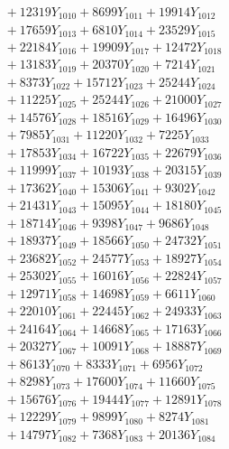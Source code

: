 \documentclass[a4paper,10pt]{article}
\begin{document}
{\begin{align}
&\;  + 12319 Y_{1010} + 8699 Y_{1011} + 19914 Y_{1012} \\[0.3ex]
&\;  + 17659 Y_{1013} + 6810 Y_{1014} + 23529 Y_{1015} \\[0.3ex]
&\;  + 22184 Y_{1016} + 19909 Y_{1017} + 12472 Y_{1018} \\[0.5ex]\allowbreak
&\;  + 13183 Y_{1019} + 20370 Y_{1020} + 7214 Y_{1021} \\[0.3ex]
&\;  + 8373 Y_{1022} + 15712 Y_{1023} + 25244 Y_{1024} \\[0.3ex]
&\;  + 11225 Y_{1025} + 25244 Y_{1026} + 21000 Y_{1027} \\[0.3ex]
&\;  + 14576 Y_{1028} + 18516 Y_{1029} + 16496 Y_{1030} \\[0.3ex]
&\;  + 7985 Y_{1031} + 11220 Y_{1032} + 7225 Y_{1033} \\[0.3ex]
&\;  + 17853 Y_{1034} + 16722 Y_{1035} + 22679 Y_{1036} \\[0.3ex]
&\;  + 11999 Y_{1037} + 10193 Y_{1038} + 20315 Y_{1039} \\[0.3ex]
&\;  + 17362 Y_{1040} + 15306 Y_{1041} + 9302 Y_{1042} \\[0.3ex]
&\;  + 21431 Y_{1043} + 15095 Y_{1044} + 18180 Y_{1045} \\[0.3ex]
&\;  + 18714 Y_{1046} + 9398 Y_{1047} + 9686 Y_{1048} \\[0.5ex]\allowbreak
&\;  + 18937 Y_{1049} + 18566 Y_{1050} + 24732 Y_{1051} \\[0.3ex]
&\;  + 23682 Y_{1052} + 24577 Y_{1053} + 18927 Y_{1054} \\[0.3ex]
&\;  + 25302 Y_{1055} + 16016 Y_{1056} + 22824 Y_{1057} \\[0.3ex]
&\;  + 12971 Y_{1058} + 14698 Y_{1059} + 6611 Y_{1060} \\[0.3ex]
&\;  + 22010 Y_{1061} + 22445 Y_{1062} + 24933 Y_{1063} \\[0.3ex]
&\;  + 24164 Y_{1064} + 14668 Y_{1065} + 17163 Y_{1066} \\[0.3ex]
&\;  + 20327 Y_{1067} + 10091 Y_{1068} + 18887 Y_{1069} \\[0.3ex]
&\;  + 8613 Y_{1070} + 8333 Y_{1071} + 6956 Y_{1072} \\[0.3ex]
&\;  + 8298 Y_{1073} + 17600 Y_{1074} + 11660 Y_{1075} \\[0.3ex]
&\;  + 15676 Y_{1076} + 19444 Y_{1077} + 12891 Y_{1078} \\[0.5ex]\allowbreak
&\;  + 12229 Y_{1079} + 9899 Y_{1080} + 8274 Y_{1081} \\[0.3ex]
&\;  + 14797 Y_{1082} + 7368 Y_{1083} + 20136 Y_{1084} \\[0.3ex]

\end{align}}
\end{document}
